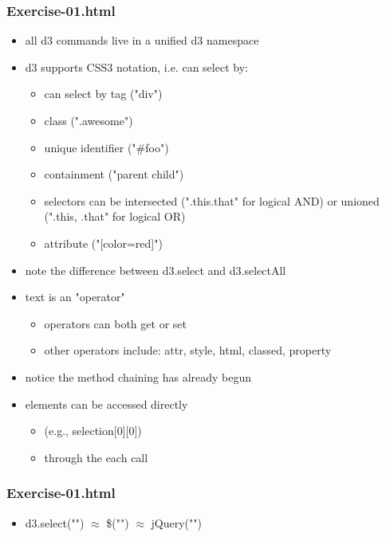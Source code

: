 \documentclass{beamer}
\begin{document}
\begin{frame}
\begin{frame}
    \frametitle{Exercise-01.html}
    \begin{itemize}
    \item all d3 commands live in a unified d3 namespace
    \item d3 supports CSS3 notation, i.e. can select by:
        \begin{itemize}
        \item can select by tag ("div")
        \item class (".awesome")
        \item unique identifier ("#foo")
        \item containment ("parent child")
        \item selectors can be intersected (".this.that" for logical AND) or unioned (".this, .that" for logical OR)
        \item attribute ("[color=red]")
        \end{itemize}
    \item note the difference between d3.select and d3.selectAll
    \item text is an "operator"
        \begin{itemize}
            \item operators can both get or set
            \item other operators include: attr, style, html, classed, property
        \end{itemize}
    \item notice the method chaining has already begun
    \item elements can be accessed directly
        \begin{itemize}
        \item (e.g., selection[0][0])
        \item through the each call
        \end{itemize}
    \end{itemize}
\end{frame}


\begin{frame}
    \frametitle{Exercise-01.html}
    \begin{itemize}
        \begin{itemize}
        \end{itemize}
                \item d3.select("") $\approx$ \$("") $\approx$ jQuery("")


\end{itemize}
\end{frame}
\end{frame}
\end{document}
